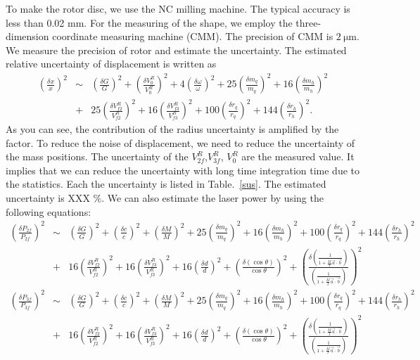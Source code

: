 \documentclass[]{spie}  %
\begin{document}
 To make the rotor disc, we use the NC milling machine. The typical accuracy is less than 0.02 mm. For the measuring of the shape, we employ the three-dimension coordinate measuring machine (CMM). The precision of CMM is $2~\mathrm{\mu m}$. We measure the precision of rotor and estimate the uncertainty. The estimated relative uncertainty of  displacement is written as
\begin{eqnarray}
\left( \frac{\delta x}{x} \right)^2 &\sim& \left( \frac{\delta G}{G} \right)^2 +\left( \frac{\delta V^R_0}{V^R_0} \right)^2+4\left( \frac{\delta \omega}{\omega} \right)^2+ 25\left( \frac{\delta m_q}{m_q} \right)^2 +16\left( \frac{\delta m_h}{m_h} \right)^2 \\
&+&25\left( \frac{\delta V^R_{f2}}{V^R_{f2}} \right)^2+16\left( \frac{\delta V^R_{f3}}{V^R_{f3}} \right)^2+ 100\left( \frac{\delta r_q}{r_q} \right)^2 +144\left( \frac{\delta r_h}{r_h} \right)^2.
\end{eqnarray}
As you can see, the contribution of the radius uncertainty is amplified by the factor. To reduce the noise of displacement, we need to reduce the uncertainty of the mass positions.
The uncertainty of the $V^R_{2f}$,$V^R_{3f}$, $V^R_{0}$ are the measured value. It implies that we can reduce the uncertainty with long time integration time due to the statistics. Each the uncertainty is listed in Table.~\ref{sus}. The estimated uncertainty is XXX \%.
We can also estimate the laser power by using the following equations:
\begin{eqnarray}
\left( \frac{\delta P_{2f}}{P_{2f}} \right)^2 &\sim& \left( \frac{\delta G}{G} \right)^2 +\left( \frac{\delta c}{c} \right)^2+ \left( \frac{\delta M}{M} \right)^2+25\left( \frac{\delta m_q}{m_q} \right)^2+16\left( \frac{\delta m_h}{m_h} \right)^2 +100\left( \frac{\delta r_q}{r_q} \right)^2+144\left( \frac{\delta r_h}{r_h} \right)^2 \\
&+&16\left( \frac{\delta V^R_{f2}}{V^R_{f2}} \right)^2+16\left( \frac{\delta V^R_{f3}}{V^R_{f3}} \right)^2+16\left( \frac{\delta d}{d} \right)^2+\left( \frac{\delta (\cos{\theta})}{\cos{\theta}} \right)^2+ \left( \frac{\delta\left( \frac{1}{1+\frac{M}{I}\vec{a}\cdot \vec{b}} \right)}{\left( \frac{1}{1+\frac{M}{I}\vec{a}\cdot \vec{b}} \right)} \right)^2 \\
\left( \frac{\delta P_{3f}}{P_{3f}} \right)^2 &\sim& \left( \frac{\delta G}{G} \right)^2 +\left( \frac{\delta c}{c} \right)^2+ \left( \frac{\delta M}{M} \right)^2+25\left( \frac{\delta m_q}{m_q} \right)^2+16\left( \frac{\delta m_h}{m_h} \right)^2 +100\left( \frac{\delta r_q}{r_q} \right)^2+144\left( \frac{\delta r_h}{r_h} \right)^2 \\
&+&16\left( \frac{\delta V^R_{f2}}{V^R_{f2}} \right)^2+16\left( \frac{\delta V^R_{f3}}{V^R_{f3}} \right)^2+16\left( \frac{\delta d}{d} \right)^2+\left( \frac{\delta (\cos{\theta})}{\cos{\theta}} \right)^2+ \left( \frac{\delta\left( \frac{1}{1+\frac{M}{I}\vec{a}\cdot \vec{b}} \right)}{\left( \frac{1}{1+\frac{M}{I}\vec{a}\cdot \vec{b}} \right)} \right)^2 \\
\end{eqnarray}
\end{document}

